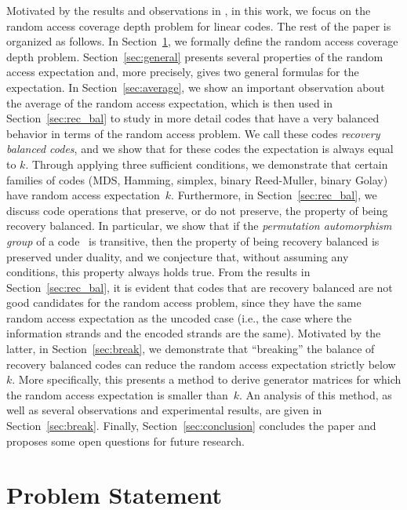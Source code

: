 \documentclass[11pt,a4paper,reqno,twoside]{amsart}
\theoremstyle{definition}
\begin{document}
Motivated by the results and observations in \cite{bar2023cover}, in this work, we focus on the random access coverage depth problem for linear codes. The rest of the paper is organized as follows. In Section~\ref{sec:def}, we formally define the random access coverage depth problem. Section~\ref{sec:general} presents several properties of the random access expectation and, more precisely, gives two general formulas for the expectation. 
In Section~\ref{sec:average}, we show an important observation about the average of the random access expectation, which is then used in Section~\ref{sec:rec_bal} to study in more detail codes that have a very balanced behavior in terms of the random access problem. We call these codes \emph{recovery balanced codes}, and we show that for these codes the expectation is always equal to $k$. Through applying three sufficient conditions, we demonstrate that certain families of codes (MDS, Hamming, simplex, binary Reed-Muller, binary Golay) have random access expectation~$k$. 
Furthermore, in Section~\ref{sec:rec_bal}, we discuss code operations that preserve, or do not preserve, the property of being recovery balanced. In particular, we show that if the \emph{permutation automorphism group} of a code~\cite{macwilliams1977theory} is transitive, then the property of being recovery balanced is preserved under duality, and we conjecture that, without assuming any conditions, this property always holds true. 
From the results in Section~\ref{sec:rec_bal}, it is evident that codes that are recovery balanced are not good candidates for the random access problem, since they have the same random access expectation as the uncoded case (i.e., the case where the information strands and the encoded strands are the same). Motivated by the latter, in Section~\ref{sec:break}, we demonstrate that ``breaking'' the balance of recovery balanced codes can reduce the random access expectation strictly below~$k$. More specifically, this presents a method to derive generator matrices for which the random access expectation is smaller than~$k$. An analysis of this method, as well as several observations and experimental results, are given in Section~\ref{sec:break}. Finally, Section~\ref{sec:conclusion} concludes the paper and proposes some open questions for future research.



\section{Problem Statement}\label{sec:def}
\end{document}
